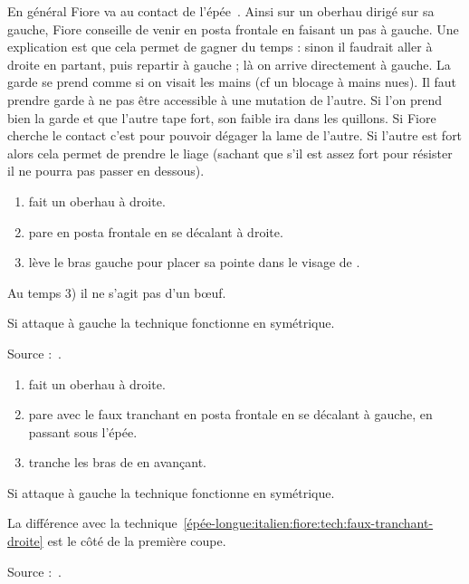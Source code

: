 En général Fiore va au contact de l'épée~\cite{campo:dijon:posta_frontale:2015}.
Ainsi sur un oberhau dirigé sur sa gauche, Fiore conseille de venir en posta frontale en faisant un pas à gauche.
Une explication est que cela permet de gagner du temps : sinon il faudrait aller à droite en partant, puis repartir à gauche ; là on arrive directement à gauche.
La garde se prend comme si on visait les mains (cf un blocage à mains nues).
Il faut prendre garde à ne pas être accessible à une mutation de l'autre.
Si l'on prend bien la garde et que l'autre tape fort, son faible ira dans les quillons.
Si Fiore cherche le contact c'est pour pouvoir dégager la lame de l'autre.
Si l'autre est fort alors cela permet de prendre le liage (sachant que s'il est assez fort pour résister il ne pourra pas passer en dessous).


\begin{technique}

\begin{enumerate}
	\item \A fait un oberhau à droite.
	\item \D pare en posta frontale en se décalant à droite.
	\item \D lève le bras gauche pour placer sa pointe dans le visage de \A.
\end{enumerate}

Au temps 3) il ne s'agit pas d'un bœuf.

Si \A attaque à gauche la technique fonctionne en symétrique.

Source :~\cite{campo:dijon:posta_frontale:2015}.

\end{technique}


\begin{technique}
\label{épée-longue:italien:fiore:tech:posta-frontale-faux-tranchant}

\begin{enumerate}
	\item \A fait un oberhau à droite.
	\item \D pare avec le faux tranchant en posta frontale en se décalant à gauche, en passant sous l'épée.
	\item \D tranche les bras de \A en avançant.
\end{enumerate}

Si \A attaque à gauche la technique fonctionne en symétrique.

La différence avec la technique~\ref{épée-longue:italien:fiore:tech:faux-tranchant-droite} est le côté de la première coupe.

Source :~\cite{campo:dijon:posta_frontale:2015}.

\end{technique}


